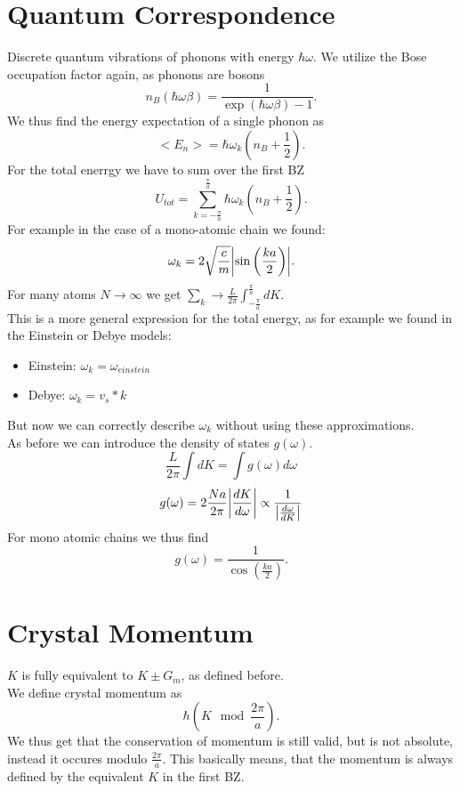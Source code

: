 \documentclass{report}
\begin{document}
\section{Quantum Correspondence}
Discrete quantum vibrations of phonons with energy $\hbar \omega$. We utilize the Bose occupation factor again, as phonons are bosons \[
	n_B\left( \hbar \omega \beta \right) = \frac{1}{\exp\left( \hbar \omega \beta \right) - 1}
.\] We thus find the energy expectation of a single phonon as \[
<E_n> = \hbar \omega_k \left( n_B + \frac{1}{2} \right) 
.\] For the total enerrgy we have to sum over the first BZ \[
U_{tot} = \sum_{k=-\frac{\pi}{a}}^{\frac{\pi}{a}} \hbar \omega_k\left( n_B + \frac{1}{2} \right) 
.\] For example in the case of a mono-atomic chain we found: \[
\omega_k = 2 \sqrt{\frac{c}{m}} \abs{\sin\left( \frac{ka}{2} \right) }
.\] For many atoms $N \to \infty$ we get $\sum_{k} \to \frac{L}{2\pi} \int_{-\frac{\pi}{a}}^{\frac{\pi}{a}}dK$.\\
This is a more general expression for the total energy, as for example we found in the Einstein or Debye models:
\begin{itemize}
	\item Einstein: $\omega_k = \omega_{einstein}$ 
	\item Debye: $\omega_k = v_s * k$
\end{itemize} But now we can correctly describe $\omega_k$ without using these approximations. \\
As before we can introduce the density of states $g(\omega)$. \[
	\frac{L}{2\pi} \int dK = \int g(\omega) d\omega
\] \[
g(\omega) = 2 \frac{Na}{2\pi} \abs{\frac{dK}{d\omega}} \propto \frac{1}{\abs{\frac{d\omega}{dK}}}
\] For mono atomic chains we thus find \[
g(\omega) = \frac{1}{\cos(\frac{ka}{2})}
.\] 
\section{Crystal Momentum}
$K$ is fully equivalent to $K \pm G_m$, as defined before. \\
We define crystal momentum as \[
	\hbar \left( K \mod \frac{2\pi}{a} \right) 
.\] We thus get that the conservation of momentum is still valid, but is not absolute, instead it occures modulo $\frac{2\pi}{a}$. This basically means, that the momentum is always defined by the equivalent $K$ in the first BZ.\\
\end{document}

